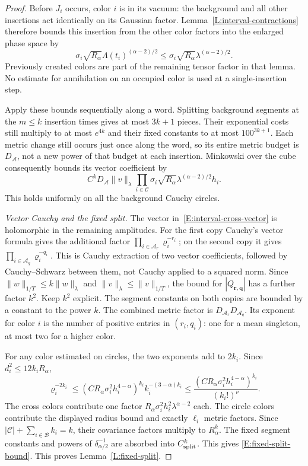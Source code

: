 \documentclass[12pt]{article}
\numberwithin{equation}{section}
\theoremstyle{definition}
\begin{document}
\begin{proof}
  Before $J_i$ occurs, color $i$ is in its vacuum: the background and
  all other insertions act identically on its Gaussian factor.
  Lemma~\ref{L:interval-contractions} therefore bounds this insertion
  from the other color factors into the enlarged phase space by
  \[
    \sigma_i\sqrt{R_\alpha}\Lambda(t_i)^{(\alpha-2)/2}
    \le\sigma_i\sqrt{R_\alpha}\lambda^{(\alpha-2)/2}.
  \]
  Previously created colors are part of the remaining tensor factor in
  that lemma. No estimate for annihilation on an occupied color is used
  at a single-insertion step.

  Apply these bounds sequentially along a word. Splitting background
  segments at the $m\le k$ insertion times gives at most $3k+1$ pieces.
  Their exponential costs still multiply to at most $e^{4k}$ and their
  fixed constants to at most $100^{3k+1}$. Each metric change still occurs
  just once along the word, so its entire metric budget is
  $D_{\mathcal A}$, not a new power of that budget at each insertion.
  Minkowski over the cube consequently bounds its vector coefficient by
  \begin{equation}\label{E:interval-cross-vector}
    C^kD_{\mathcal A}\|v\|_\lambda
    \prod_{i\in\mathcal C}
    \sigma_i\sqrt{R_\alpha}\lambda^{(\alpha-2)/2}h_i .
  \end{equation}
  This holds uniformly on all the background Cauchy circles.

  \emph{Vector Cauchy and the fixed split.}
  The vector in~\eqref{E:interval-cross-vector} is holomorphic in the
  remaining amplitudes. For the first copy Cauchy's vector formula gives
  the additional factor $\prod_{i\in\mathcal A_r}\varrho_i^{-r_i}$;
  on the second copy it gives $\prod_{i\in\mathcal A_q}\varrho_i^{-q_i}$.
  This is Cauchy extraction of two vector coefficients, followed by
  Cauchy--Schwarz between them, not Cauchy applied to a squared norm.
  Since $\|w\|_{1/T}\le k\|w\|_\lambda$ and
  $\|v\|_\lambda\le\|v\|_{1/T}$, the bound for
  $|Q_{\boldsymbol r,\boldsymbol q}|$ has a further factor $k^2$.
  Keep $k^2$ explicit. The segment constants on both copies are bounded
  by a constant to the power $k$.
  The combined metric factor is $D_{\mathcal A_r}D_{\mathcal A_q}$.
  Its exponent for color $i$ is the number of positive entries in
  $(r_i,q_i)$: one for a mean singleton, at most two for a higher color.

  For any color estimated on circles, the two exponents add to $2k_i$.
  Since $d_i^2\le12k_iR_\alpha$,
  \[
    \varrho_i^{-2k_i}
    \le(CR_\alpha\sigma_i^2h_i^{4-\alpha})^{k_i}
    k_i^{-(3-\alpha)k_i}
    \le\frac{(CR_\alpha\sigma_i^2h_i^{4-\alpha})^{k_i}}
    {(k_i!)^\nu}.
  \]
  The cross colors contribute one factor
  $R_\alpha\sigma_i^2h_i^2\lambda^{\alpha-2}$ each.
  The circle colors contribute the displayed radius bound and exactly
  $\ell_i$ metric factors. Since
  $|\mathcal C|+\sum_{i\in\mathcal B}k_i=k$,
  their covariance factors multiply to $R_\alpha^k$.
  The fixed segment constants and powers of $\delta_{\alpha/2}^{-1}$
  are absorbed into $C_{\rm split}^k$. This gives
  \eqref{E:fixed-split-bound}. This proves Lemma~\ref{L:fixed-split}.
\end{proof}
\end{document}

